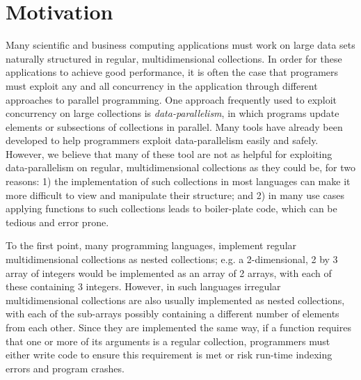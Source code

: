 \section{Motivation}
Many scientific and business computing applications must work on large data sets naturally structured in regular, multidimensional collections.
In order for these applications to achieve good performance, it is often the case that programers must exploit any and all concurrency in the application through different approaches to parallel programming.
One approach frequently used to exploit concurrency on large collections is \textit{data-parallelism}, in which programs update elements or subsections of collections in parallel.
Many tools have already been developed to help programmers exploit data-parallelism easily and safely. %
However, we believe that many of these tool are not as helpful for exploiting data-parallelism on regular, multidimensional collections as they could be, for two reasons: 
1) the implementation of such collections in most languages can make it more difficult to view and manipulate their structure; and 
2) in many use cases applying functions to such collections leads to boiler-plate code, which can be tedious and error prone.

To the first point, many programming languages, implement regular multidimensional collections as nested collections; 
e.g. a 2-dimensional, 2 by 3 array of integers would be implemented as an array of 2 arrays, with each of these containing 3 integers.
However, in such languages irregular multidimensional collections are also usually implemented as nested collections, with each of the sub-arrays possibly containing a different number of elements from each other.
Since they are implemented the same way, if a function requires that one or more of its arguments is a regular collection, programmers must either write code to ensure this requirement is met or risk run-time indexing errors and program crashes.

